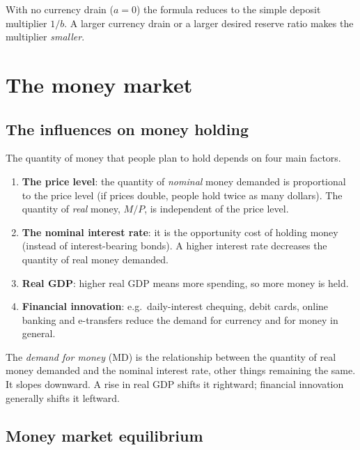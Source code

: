 \begin{important}[Pitfall]
With no currency drain ($a = 0$) the formula reduces to the simple deposit multiplier
$1/b$. A larger currency drain or a larger desired reserve ratio makes the multiplier
\emph{smaller}.
\end{important}

\section{The money market}

\subsection{The influences on money holding}

The quantity of money that people plan to hold depends on four main factors.
\begin{enumerate}
  \item \textbf{The price level}: the quantity of \emph{nominal} money demanded is
        proportional to the price level (if prices double, people hold twice as many
        dollars). The quantity of \emph{real} money, $M/P$, is independent of the price
        level.
  \item \textbf{The nominal interest rate}: it is the opportunity cost of holding money
        (instead of interest-bearing bonds). A higher interest rate decreases the
        quantity of real money demanded.
  \item \textbf{Real GDP}: higher real GDP means more spending, so more money is held.
  \item \textbf{Financial innovation}: e.g.\ daily-interest chequing, debit cards, online
        banking and e-transfers reduce the demand for currency and for money in general.
\end{enumerate}

\begin{definition}
The \emph{demand for money} (MD) is the relationship between the quantity of real money
demanded and the nominal interest rate, other things remaining the same. It slopes
downward. A rise in real GDP shifts it rightward; financial innovation generally shifts it
leftward.
\end{definition}

\subsection{Money market equilibrium}

